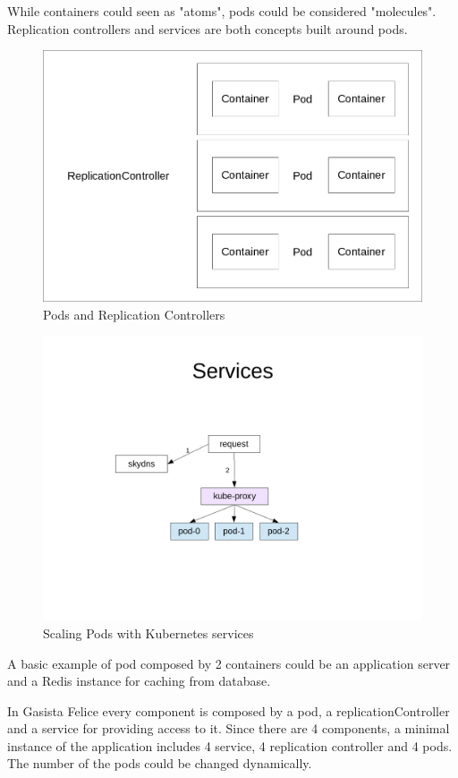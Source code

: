 While containers could seen as "atoms", pods could be considered "molecules".  Replication controllers and services are both concepts built around pods.

\begin{figure}[htbp]
\centering
\includegraphics{media/ch5-pods-rcs.png}
\caption{Pods and Replication Controllers}
\end{figure}

\begin{figure}[htbp]
\centering
\includegraphics{media/ch5-services.png}
\caption{Scaling Pods with Kubernetes services}
\end{figure}
A basic example of pod composed by 2 containers could be an application server and a Redis instance for caching from database.

In Gasista Felice every component is composed by a pod, a replicationController and a service for providing access to it.  Since there are 4 components, a minimal instance of the application includes 4 service, 4 replication controller and 4 pods.  The number of the pods could be changed dynamically.

